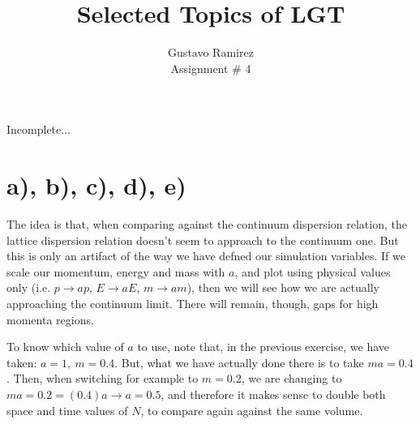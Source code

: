\documentclass[11pt]{article}
\title{\textbf{Selected Topics of LGT}}
\author{Gustavo Ramirez\\
		Assignment \# 4}
\date{}
\begin{document}
\maketitle

Incomplete...


\section{a), b), c), d), e)}

The idea is that, when comparing against the continuum dispersion relation, the lattice dispersion relation doesn't seem to approach to the continuum one. But this is only an artifact of the way we have defned our simulation variables. If we scale our momentum, energy and mass with $a$, and plot using physical values only (i.e. $p\rightarrow ap$, $E\rightarrow aE$, $m\rightarrow am$), then we will see how we are actually approaching the continuum limit. There will remain, though, gaps for high momenta regions.

To know which value of $a$ to use, note that, in the previous exercise, we have taken: $a=1, \ m=0.4$. But, what we have actually done there is to take $ma=0.4$. Then, when switching for example to $m=0.2$, we are changing to $ma=0.2=(0.4)a \rightarrow a = 0.5$, and therefore it makes sense to double both space and time values of $N$, to compare again against the same volume.
\end{document}
